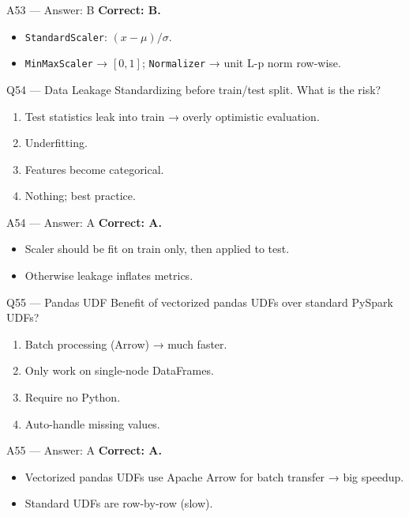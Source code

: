 \documentclass[aspectratio=169,10pt]{beamer}
\begin{document}
	\begin{frame}{A53 — Answer: B}
		\textbf{Correct: B.}
		\begin{itemize}
			\item \texttt{StandardScaler}: $(x - \mu)/\sigma$.
			\item \texttt{MinMaxScaler} → $[0,1]$; \texttt{Normalizer} → unit L-p norm row-wise.
		\end{itemize}
	\end{frame}
	
	\begin{frame}{Q54 — Data Leakage}
		Standardizing before train/test split. What is the risk?
		\begin{enumerate}[label=\Alph*.]
			\item Test statistics leak into train → overly optimistic evaluation.
			\item Underfitting.
			\item Features become categorical.
			\item Nothing; best practice.
		\end{enumerate}
	\end{frame}
	
	\begin{frame}{A54 — Answer: A}
		\textbf{Correct: A.}
		\begin{itemize}
			\item Scaler should be fit on train only, then applied to test.
			\item Otherwise leakage inflates metrics.
		\end{itemize}
	\end{frame}
	
	\begin{frame}{Q55 — Pandas UDF}
		Benefit of vectorized pandas UDFs over standard PySpark UDFs?
		\begin{enumerate}[label=\Alph*.]
			\item Batch processing (Arrow) → much faster.
			\item Only work on single-node DataFrames.
			\item Require no Python.
			\item Auto-handle missing values.
		\end{enumerate}
	\end{frame}
	
	\begin{frame}{A55 — Answer: A}
		\textbf{Correct: A.}
		\begin{itemize}
			\item Vectorized pandas UDFs use Apache Arrow for batch transfer → big speedup.
			\item Standard UDFs are row-by-row (slow).
		\end{itemize}
	\end{frame}
	
\end{document}

